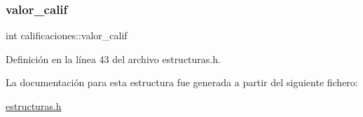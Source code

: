 \subsubsection{\texorpdfstring{valor\+\_\+calif}{valor\_calif}}
{\footnotesize\ttfamily int calificaciones\+::valor\+\_\+calif}



Definición en la línea 43 del archivo estructuras.\+h.



La documentación para esta estructura fue generada a partir del siguiente fichero\+:\begin{DoxyCompactItemize}
\item 
\mbox{\hyperlink{estructuras_8h}{estructuras.\+h}}\end{DoxyCompactItemize}
